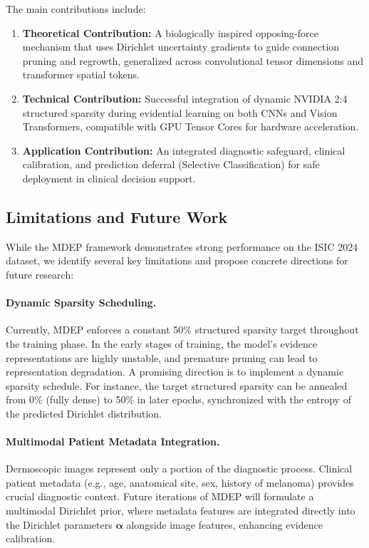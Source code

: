\documentclass[letterpaper]{article} %
\begin{document}
The main contributions include:
\begin{enumerate}
    \item \textbf{Theoretical Contribution:} A biologically inspired opposing-force mechanism that uses Dirichlet uncertainty gradients to guide connection pruning and regrowth, generalized across convolutional tensor dimensions and transformer spatial tokens.
    \item \textbf{Technical Contribution:} Successful integration of dynamic NVIDIA 2:4 structured sparsity during evidential learning on both CNNs and Vision Transformers, compatible with GPU Tensor Cores for hardware acceleration.
    \item \textbf{Application Contribution:} An integrated diagnostic safeguard, clinical calibration, and prediction deferral (Selective Classification) for safe deployment in clinical decision support.
\end{enumerate}

\subsection{Limitations and Future Work}\label{subsec:limitations}

While the MDEP framework demonstrates strong performance on the ISIC 2024 dataset, we identify several key limitations and propose concrete directions for future research:

\paragraph{Dynamic Sparsity Scheduling.} Currently, MDEP enforces a constant 50\% structured sparsity target throughout the training phase. In the early stages of training, the model's evidence representations are highly unstable, and premature pruning can lead to representation degradation. A promising direction is to implement a dynamic sparsity schedule. For instance, the target structured sparsity can be annealed from 0\% (fully dense) to 50\% in later epochs, synchronized with the entropy of the predicted Dirichlet distribution.

\paragraph{Multimodal Patient Metadata Integration.} Dermoscopic images represent only a portion of the diagnostic process. Clinical patient metadata (e.g., age, anatomical site, sex, history of melanoma) provides crucial diagnostic context. Future iterations of MDEP will formulate a multimodal Dirichlet prior, where metadata features are integrated directly into the Dirichlet parameters $\bm{\alpha}$ alongside image features, enhancing evidence calibration.
\end{document}
